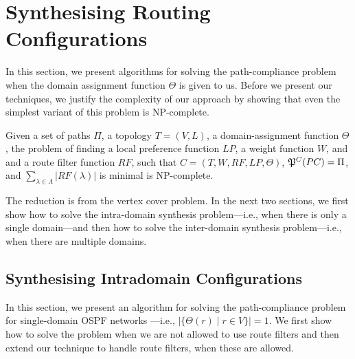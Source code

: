 \section{Synthesising Routing Configurations}

In this section, we present algorithms for 
solving the path-compliance problem when the domain
assignment function $\Theta$ is given to us.
Before we present our techniques,
we justify the complexity of our approach by showing that
even the simplest variant of this problem is NP-complete.

\begin{theorem}
\label{thm:ospfsynth}
Given a set of paths $\Pi$,
a topology $T=(V,L)$,
a domain-assignment function $\Theta$, 
the problem of finding 
a local preference  function $LP$, 
a weight function $W$, and 
and a route filter function $RF$,  such that
$C=(T,W,RF,LP,\Theta)$,
$\mathfrak{P}^C(PC) = \Pi$,
and 
$\sum_{\lambda\in\Lambda} |RF(\lambda)|$ is minimal is NP-complete.
\end{theorem}
\iffull

\else
The reduction is from the vertex cover problem.
\fi
In the next two sections, we first show how to solve the intra-domain synthesis problem---i.e., when there
is only a single domain---and then how to solve the inter-domain synthesis problem---i.e., when
there are multiple domains.

\subsection{Synthesising Intradomain Configurations} \label{sec:synthesis}
In this section, we present an algorithm for 
solving the path-compliance problem for 
single-domain OSPF networks
---i.e., $|\{\Theta(r) \mid r\in V\}|=1$.
We first show how to solve the problem when
we are not allowed to use route filters
and then
extend our technique to handle route filters, when these are allowed.

